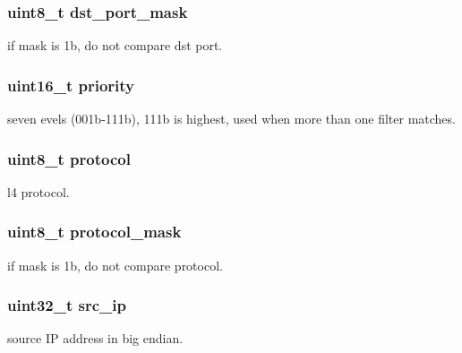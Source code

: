 \subsubsection[{dst\+\_\+port\+\_\+mask}]{\setlength{\rightskip}{0pt plus 5cm}uint8\+\_\+t dst\+\_\+port\+\_\+mask}\label{structrte__5tuple__filter_a3c1c59f1493644594dfc6e6907a97936}
if mask is 1b, do not compare dst port. \hypertarget{structrte__5tuple__filter_a0815784d41b3c13d42ce22367abfba1d}{}
\subsubsection[{priority}]{\setlength{\rightskip}{0pt plus 5cm}uint16\+\_\+t priority}\label{structrte__5tuple__filter_a0815784d41b3c13d42ce22367abfba1d}
seven evels (001b-\/111b), 111b is highest, used when more than one filter matches. \hypertarget{structrte__5tuple__filter_ad124d3d2e02c729afa303c775295278e}{}
\subsubsection[{protocol}]{\setlength{\rightskip}{0pt plus 5cm}uint8\+\_\+t protocol}\label{structrte__5tuple__filter_ad124d3d2e02c729afa303c775295278e}
l4 protocol. \hypertarget{structrte__5tuple__filter_a0ea646479ef8e5bfe19d3f48130de32a}{}
\subsubsection[{protocol\+\_\+mask}]{\setlength{\rightskip}{0pt plus 5cm}uint8\+\_\+t protocol\+\_\+mask}\label{structrte__5tuple__filter_a0ea646479ef8e5bfe19d3f48130de32a}
if mask is 1b, do not compare protocol. \hypertarget{structrte__5tuple__filter_aacb87cb8b0e6a2622b48ebe0553cf988}{}
\subsubsection[{src\+\_\+ip}]{\setlength{\rightskip}{0pt plus 5cm}uint32\+\_\+t src\+\_\+ip}\label{structrte__5tuple__filter_aacb87cb8b0e6a2622b48ebe0553cf988}
source I\+P address in big endian. \hypertarget{structrte__5tuple__filter_a24ea1adca0aeaee4b61cf17bafc9d156}{}
